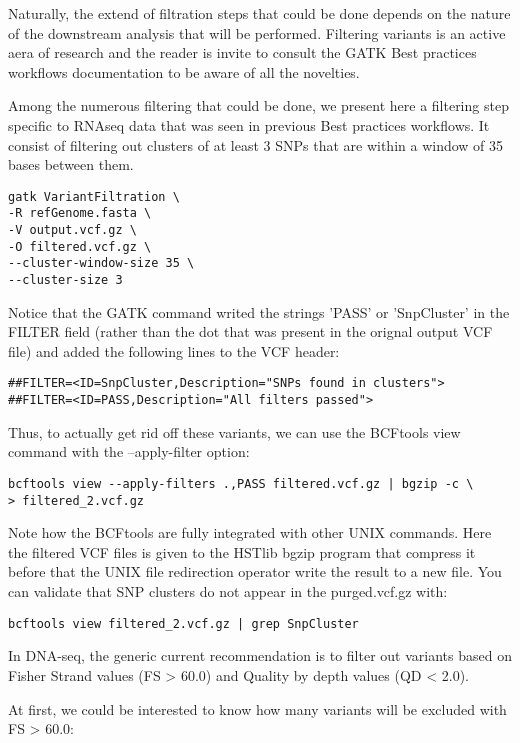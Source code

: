 Naturally, the extend of filtration steps that could be done depends on the nature of the downstream analysis that will be performed. Filtering variants is an active aera of research and the reader is invite to consult the GATK Best practices workflows documentation to be aware of all the novelties.

Among the numerous filtering that could be done, we present here a filtering step specific to RNAseq data that was seen in previous Best practices workflows. It consist of filtering out clusters of at least 3 SNPs that are within a window of 35 bases between them.


\begin{verbatim}
gatk VariantFiltration \
-R refGenome.fasta \
-V output.vcf.gz \
-O filtered.vcf.gz \
--cluster-window-size 35 \
--cluster-size 3
\end{verbatim}

Notice that the GATK command writed the strings 'PASS' or 'SnpCluster' in the FILTER field (rather than the dot that was present in the orignal output VCF file) and added the following lines to the VCF header:

\begin{verbatim}
##FILTER=<ID=SnpCluster,Description="SNPs found in clusters">
##FILTER=<ID=PASS,Description="All filters passed">
\end{verbatim}


Thus, to actually get rid off these variants, we can use the BCFtools view command with the --apply-filter option:
\begin{verbatim}
bcftools view --apply-filters .,PASS filtered.vcf.gz | bgzip -c \
> filtered_2.vcf.gz
\end{verbatim}


Note how the BCFtools are fully integrated with other UNIX commands. Here the filtered VCF files is given to the HSTlib bgzip program that compress it before that the UNIX file redirection operator write the result to a new file. You can validate that SNP clusters do not appear in the purged.vcf.gz with:


\begin{verbatim}
bcftools view filtered_2.vcf.gz | grep SnpCluster
\end{verbatim}

In DNA-seq, the generic current recommendation is to filter out variants based on Fisher Strand values (FS > 60.0) and Quality by depth values (QD < 2.0).

At first, we could be interested to know how many variants will be excluded with FS > 60.0:

